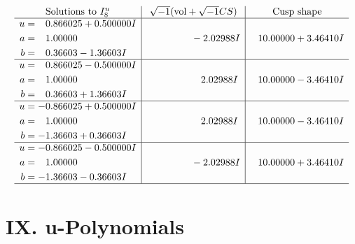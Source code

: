 \documentclass[1p]{elsarticle_modified}
\theoremstyle{definition}
\newcommand{\I}{\sqrt{-1}}
\begin{document}
$$\begin{array}{c|c|c}  
\text{Solutions to }I^u_{8}& \I (\text{vol} + \sqrt{-1}CS) & \text{Cusp shape}\\
 \hline 
\begin{aligned}
u &= \phantom{-}0.866025 + 0.500000 I \\
a &= \phantom{-}1.00000\phantom{ +0.000000I} \\
b &= \phantom{-}0.36603 - 1.36603 I\end{aligned}
 & \phantom{-0.000000 } -2.02988 I & \phantom{-}10.00000 + 3.46410 I \\ \hline\begin{aligned}
u &= \phantom{-}0.866025 - 0.500000 I \\
a &= \phantom{-}1.00000\phantom{ +0.000000I} \\
b &= \phantom{-}0.36603 + 1.36603 I\end{aligned}
 & \phantom{-0.000000 -}2.02988 I & \phantom{-}10.00000 - 3.46410 I \\ \hline\begin{aligned}
u &= -0.866025 + 0.500000 I \\
a &= \phantom{-}1.00000\phantom{ +0.000000I} \\
b &= -1.36603 + 0.36603 I\end{aligned}
 & \phantom{-0.000000 -}2.02988 I & \phantom{-}10.00000 - 3.46410 I \\ \hline\begin{aligned}
u &= -0.866025 - 0.500000 I \\
a &= \phantom{-}1.00000\phantom{ +0.000000I} \\
b &= -1.36603 - 0.36603 I\end{aligned}
 & \phantom{-0.000000 } -2.02988 I & \phantom{-}10.00000 + 3.46410 I\\
 \hline 
 \end{array}$$\newpage
\newpage\renewcommand{\arraystretch}{1}
\centering \section*{ IX. u-Polynomials}
\end{document}

